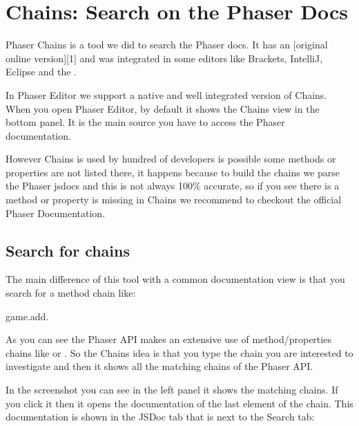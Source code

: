 \documentclass[letterpaper,10pt,english]{sphinxmanual}
\begin{document}
\noindent{}


\chapter{Chains: Search on the Phaser Docs}
\label{\detokenize{chains:chains-search-on-the-phaser-docs}}\label{\detokenize{chains::doc}}
Phaser Chains is a tool we did to search the Phaser docs. It has an {[}original online version{]}{[}1{]} and was integrated in some editors like Brackets, IntelliJ, Eclipse and the .

In Phaser Editor we support a native and well integrated version of Chains. When you open Phaser Editor, by default it shows the Chains view in the bottom panel. It is the main source you have to access the Phaser documentation.

However Chains is used by hundred of developers is possible some methods or properties are not listed there, it happens because to build the chains we parse the Phaser jsdocs and this is not always 100\% accurate, so if you see there is a method or property is missing in Chains we recommend to checkout the official Phaser Documentation.


\section{Search for chains}
\label{\detokenize{chains:search-for-chains}}
The main difference of this tool with a common documentation view is that you search for a method chain like:

\begin{sphinxVerbatim}[commandchars=\\\{\}]
game.add.
\end{sphinxVerbatim}

As you can see the Phaser API makes an extensive use of method/properties chains like  or . So the Chains idea is that you type the chain you are interested to investigate and then it shows all the matching chains of the Phaser API.

\noindent{}

In the screenshot you can see in the left panel it shows the matching chains. If you click it then it opens the documentation of the last element of the chain. This documentation is shown in the JSDoc tab that is next to the Search tab:
\end{document}

